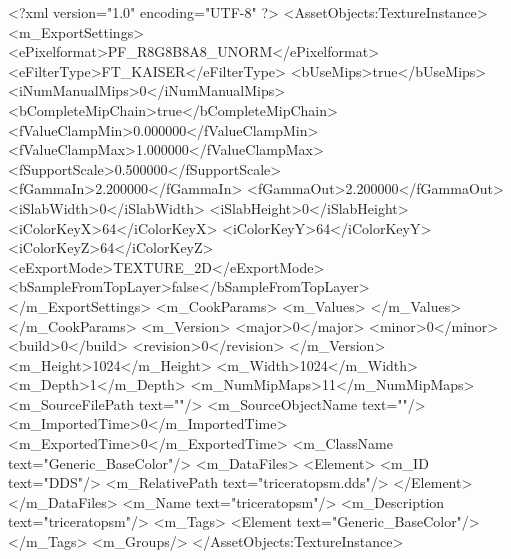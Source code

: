 <?xml version="1.0" encoding="UTF-8" ?>
<AssetObjects:TextureInstance>
<m_ExportSettings>
<ePixelformat>PF_R8G8B8A8_UNORM</ePixelformat>
<eFilterType>FT_KAISER</eFilterType>
<bUseMips>true</bUseMips>
<iNumManualMips>0</iNumManualMips>
<bCompleteMipChain>true</bCompleteMipChain>
<fValueClampMin>0.000000</fValueClampMin>
<fValueClampMax>1.000000</fValueClampMax>
<fSupportScale>0.500000</fSupportScale>
<fGammaIn>2.200000</fGammaIn>
<fGammaOut>2.200000</fGammaOut>
<iSlabWidth>0</iSlabWidth>
<iSlabHeight>0</iSlabHeight>
<iColorKeyX>64</iColorKeyX>
<iColorKeyY>64</iColorKeyY>
<iColorKeyZ>64</iColorKeyZ>
<eExportMode>TEXTURE_2D</eExportMode>
<bSampleFromTopLayer>false</bSampleFromTopLayer>
</m_ExportSettings>
<m_CookParams>
<m_Values>
</m_Values>
</m_CookParams>
<m_Version>
<major>0</major>
<minor>0</minor>
<build>0</build>
<revision>0</revision>
</m_Version>
<m_Height>1024</m_Height>
<m_Width>1024</m_Width>
<m_Depth>1</m_Depth>
<m_NumMipMaps>11</m_NumMipMaps>
<m_SourceFilePath text=""/>
<m_SourceObjectName text=""/>
<m_ImportedTime>0</m_ImportedTime>
<m_ExportedTime>0</m_ExportedTime>
<m_ClassName text="Generic_BaseColor"/>
<m_DataFiles>
<Element>
<m_ID text="DDS"/>
<m_RelativePath text="triceratopsm.dds"/>
</Element>
</m_DataFiles>
<m_Name text="triceratopsm"/>
<m_Description text="triceratopsm"/>
<m_Tags>
<Element text="Generic_BaseColor"/>
</m_Tags>
<m_Groups/>
</AssetObjects:TextureInstance>
